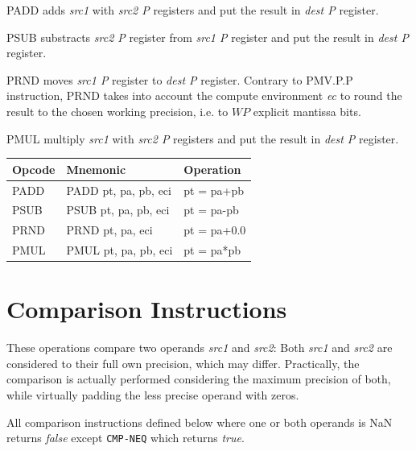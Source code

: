 PADD adds {\em src1} with {\em src2 P} registers and put the result in {\em dest P} register.

PSUB substracts {\em src2 P} register from {\em src1 P} register and put the result in {\em dest P} register.

PRND moves  {\em src1 P} register to {\em dest P} register. 
Contrary to PMV.P.P instruction, PRND takes into account the compute environment {\em ec} to round the result to the chosen working precision, i.e. to $WP$ explicit mantissa bits.

PMUL multiply {\em src1} with {\em src2 P} registers and put the result in {\em dest P} register.

\begin{center}
    \begin{tabular}{|l|l|t|}
    \hline
    Opcode  & Mnemonic & Operation \\
    \hline
    PADD    & PADD pt, pa, pb, eci &  pt = pa+pb  \\
    \hline
    PSUB    & PSUB pt, pa, pb, eci &  pt = pa-pb  \\
    \hline
    PRND    & PRND pt, pa, eci    &  pt = pa+0.0 \\
    \hline
    PMUL    & PMUL pt, pa, pb, eci &  pt = pa*pb  \\
    \hline
    \end{tabular}
\end{center}

\section{Comparison Instructions}
  These operations compare two operands \emph{src1} and \emph{src2}: Both \emph{src1} and \emph{src2} are considered to their full own precision, which may differ. Practically, the comparison is actually performed considering the maximum precision of both, while virtually padding the less precise operand with zeros.

All comparison instructions defined below where one or both operands is NaN returns \emph{false} except \texttt{CMP-NEQ} which returns \emph{true}.

